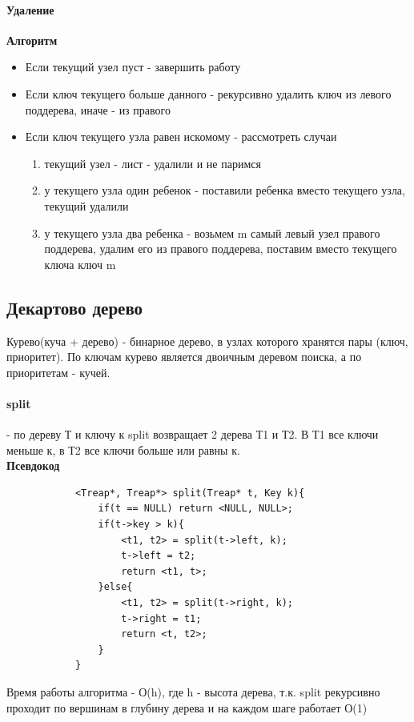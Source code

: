 \documentclass[a4paper,10pt]{article}
\begin{document}
\paragraph{Удаление}
\textbf{Алгоритм}
\begin{itemize}
	\item Если текущий узел пуст - завершить работу
	\item Если ключ текущего больше данного - рекурсивно удалить ключ из левого поддерева, иначе - из правого
	\item Если ключ текущего узла равен искомому - рассмотреть случаи 
	\begin{enumerate}
		\item текущий узел - лист - удалили и не паримся
		\item у текущего узла один ребенок - поставили ребенка вместо текущего узла, текущий удалили
		\item у текущего узла два ребенка - возьмем m самый левый узел правого поддерева, удалим его из правого поддерева, поставим вместо текущего ключа ключ m
	\end{enumerate}
\end{itemize}
\subsection{Декартово дерево}
Курево(куча + дерево) - бинарное дерево, в узлах которого хранятся пары (ключ, приоритет). По ключам курево является двоичным деревом поиска, а по приоритетам - кучей.
\paragraph{split} - по дереву Т и ключу к split возвращает 2 дерева Т1 и Т2. В Т1 все ключи меньше к, в Т2 все ключи больше или равны к.\\
\textbf{Псевдокод}\\
\begin{center}
		\begin{lstlisting}
			<Treap*, Treap*> split(Treap* t, Key k){
				if(t == NULL) return <NULL, NULL>;
				if(t->key > k){
					<t1, t2> = split(t->left, k);
					t->left = t2;
					return <t1, t>;
				}else{
					<t1, t2> = split(t->right, k);
					t->right = t1;
					return <t, t2>;
				}
			}
		\end{lstlisting}
	\end{center}
Время работы алгоритма - О(h), где h - высота дерева, т.к. split рекурсивно проходит по вершинам в глубину дерева и на каждом шаге работает О(1)
\end{document}
